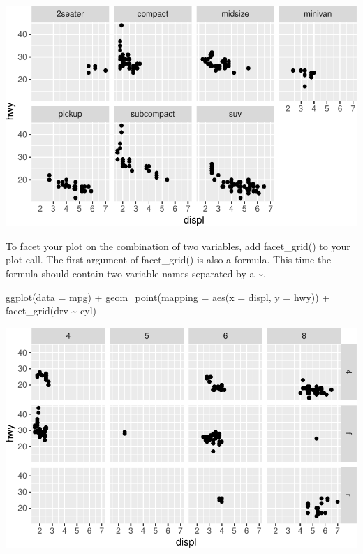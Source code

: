 \documentclass[
  letterpaper,
  DIV=11,
  numbers=noendperiod]{scrreprt}
\newenvironment{Shaded}{\begin{snugshade}}{\end{snugshade}}
\newcommand{\AttributeTok}[1]{\textcolor[rgb]{0.40,0.45,0.13}{#1}}
\newcommand{\FunctionTok}[1]{\textcolor[rgb]{0.28,0.35,0.67}{#1}}
\newcommand{\NormalTok}[1]{\textcolor[rgb]{0.00,0.23,0.31}{#1}}
\newcommand{\SpecialCharTok}[1]{\textcolor[rgb]{0.37,0.37,0.37}{#1}}
\begin{document}
\includegraphics{Beginning_Data_Visualization_files/figure-pdf/Example 6-1.pdf}

To facet your plot on the combination of two variables, add
facet\_grid() to your plot call. The first argument of facet\_grid() is
also a formula. This time the formula should contain two variable names
separated by a \textasciitilde.

\begin{Shaded}
\begin{Highlighting}[]
\FunctionTok{ggplot}\NormalTok{(}\AttributeTok{data =}\NormalTok{ mpg) }\SpecialCharTok{+} 
  \FunctionTok{geom\_point}\NormalTok{(}\AttributeTok{mapping =} \FunctionTok{aes}\NormalTok{(}\AttributeTok{x =}\NormalTok{ displ, }\AttributeTok{y =}\NormalTok{ hwy)) }\SpecialCharTok{+} 
  \FunctionTok{facet\_grid}\NormalTok{(drv }\SpecialCharTok{\textasciitilde{}}\NormalTok{ cyl)}
\end{Highlighting}
\end{Shaded}

\includegraphics{Beginning_Data_Visualization_files/figure-pdf/Example 7-1.pdf}
\end{document}
